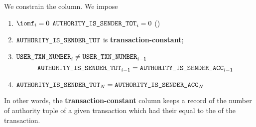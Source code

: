 We constrain the \authorityIsSenderTot{} column.
We impose
\begin{enumerate}
	\item
		\If   $\iomf _{i} = 0$
		\Then $\texttt{AUTHORITY\_IS\_SENDER\_TOT} _{i} = 0$
		(\sanityCheck)
	\item
		$\texttt{AUTHORITY\_IS\_SENDER\_TOT}$ is \textbf{transaction-constant};
	\item
		\If   $\texttt{USER}\texttt{\_}\texttt{TXN\_NUMBER} _{i} \neq \texttt{USER}\texttt{\_}\texttt{TXN\_NUMBER} _{i - 1}$
		\Then
		\[ \texttt{AUTHORITY\_IS\_SENDER\_TOT} _{i - 1} = \texttt{AUTHORITY\_IS\_SENDER\_ACC} _{i - 1} \]
	\item
		$\texttt{AUTHORITY\_IS\_SENDER\_TOT} _{N} = \texttt{AUTHORITY\_IS\_SENDER\_ACC} _{N}$
\end{enumerate}
\saNote{}
In other words, the \textbf{transaction-constant} column
\authorityIsSenderTot{} keeps a record of the
number of authority tuple of a given transaction which had their
\locAuthorityAddress{} equal to the
\locSenderAddress{} of the transaction.
